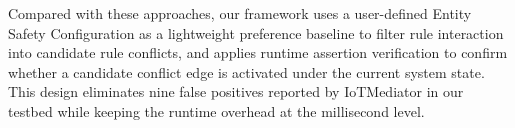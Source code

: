 Compared with these approaches, our framework uses a user-defined Entity Safety Configuration as a lightweight preference baseline to filter rule interaction into candidate rule conflicts, and applies runtime assertion verification to confirm whether a candidate conflict edge is activated under the current system state. This design eliminates nine false positives reported by IoTMediator in our testbed while keeping the runtime overhead at the millisecond level.